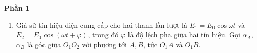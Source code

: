 \begin{loigiai}
\begin{center}
   \bf Phần 1
\end{center}
\begin{enumerate}[1)]
    \item Giả sử tín hiệu điện cung cấp cho hai thanh lần lượt là $E_1 = E_0 \cos \omega t$ và $E_2 = E_0 \cos (\omega t + \varphi)$, trong đó $\varphi$ là độ lệch pha giữa hai tín hiệu. Gọi $\alpha_A$, $\alpha_B$ là góc giữa $O_1O_2$ với phương tới $A,B$, tức $O_1A$ và $O_1B$. 
    \begin{center}

\begin{tikzpicture}[x=0.75pt,y=0.75pt,yscale=-1,xscale=1,scale=0.7]


\end{tikzpicture}
\end{center}
\end{enumerate}
\end{loigiai}
